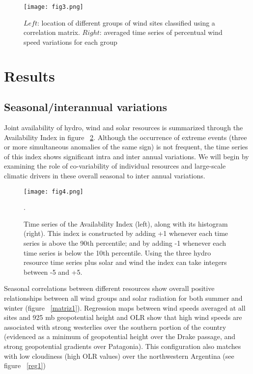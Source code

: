 \documentclass[AMA,Times1COL]{WileyNJDv5} %
\begin{document}
\begin{linenumbers}
\begin{figure}[hbpt]
	\centering
	\hspace*{0cm}   
	\texttt{[image: fig3.png]}
	\caption{\label{series} $Left$: location of different groups of wind sites classified using a correlation matrix. $Right$: averaged time series of percentual wind speed variations for each group}
\end{figure}

\section{Results}

\subsection{Seasonal/interannual variations}

Joint availability of hydro, wind and solar resources is summarized through the Availability Index in figure ~\ref{cases}. Although the occurrence of extreme events (three or more simultaneous anomalies of the same sign) is not frequent, the time series of this index shows significant intra and inter annual variations. We will begin by examining the role of co-variability of individual resources and large-scale climatic drivers in these overall seasonal to inter annual variations.

\begin{figure}[hbpt]
	\centering
	\hspace*{-1cm}   
	\texttt{[image: fig4.png]}
	\caption{\label{cases} Time series of the Availability Index (left), along with its histogram (right). This index is constructed by adding +1 whenever each time series is above the 90th percentile; and by adding -1 whenever each time series is below the 10th percentile. Using the three hydro resource time series plus solar and wind the index can take integers between -5 and +5.}. 
\end{figure}

Seasonal correlations between different resources show overall positive relationships between all wind groups and solar radiation for both summer and winter (figure ~\ref{matriz1}). Regression maps between wind speeds averaged at all sites and 925 mb geopotential height and OLR show that high wind speeds are associated with strong westerlies over the southern portion of the country (evidenced as a minimum of geopotential height over the Drake passage, and strong geopotential gradients over Patagonia). This configuration also matches with low cloudiness (high OLR values) over the northwestern Argentina (see figure ~\ref{reg1})                                    


\end{linenumbers}
\end{document}
